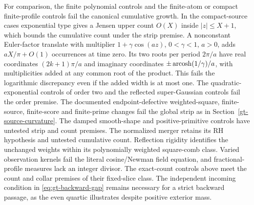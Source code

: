 For comparison, the finite polynomial controls and the finite-atom
or compact finite-profile controls fail the canonical cumulative
growth. In the compact-source cases exponential type gives a
Jensen upper count \(O(X)\) inside \(|z|\le X+1\), which bounds
the cumulative count under the strip premise. A nonconstant
Euler-factor translate with multiplier \(1+\gamma\cos(az)\),
\(0<\gamma<1\), \(a>0\), adds \(aX/\pi+O(1)\) occurrences
at time zero. Its two roots per period \(2\pi/a\) have real
coordinates \((2k+1)\pi/a\) and imaginary coordinates
\(\pm\operatorname{arcosh}(1/\gamma)/a\), with multiplicities added at any
common root of the product. This fails the logarithmic discrepancy
even if the added width is at most one. The quadratic-exponential
controls of order two and the reflected super-Gaussian controls
fail the order premise. The documented endpoint-defective weighted-square,
finite-source, finite-score and finite-prime changes fail the
global strip as in Section~\ref{gt-source-curvature}. The damped
smooth-shape and positive-primitive controls have untested strip
and count premises. The normalized merger retains its RH hypothesis
and untested cumulative count. Reflection rigidity identifies the
unchanged weights within its polynomially weighted square-comb class.
Varied observation kernels fail the literal cosine/Newman field
equation, and fractional-profile measures lack an integer divisor.
The exact-count controls above meet the count and collar premises
of their fixed-slice class. The independent incoming condition in
\eqref{eq:gt-backward-gap} remains necessary for a strict backward
passage, as the even quartic illustrates despite positive exterior
mass. \cite{gtjoint,gtfar,gtcounts}
